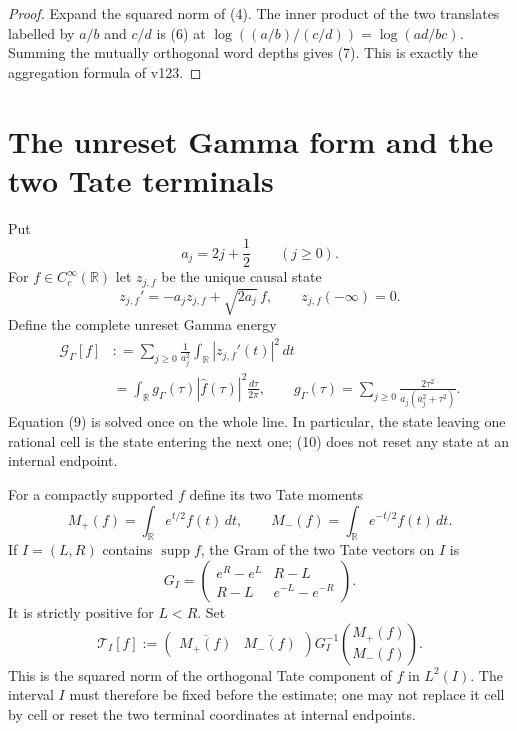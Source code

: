 \documentclass[11pt]{article}
\begin{document}
\begin{proof}
Expand the squared norm of (4).  The inner product of the two translates
labelled by $a/b$ and $c/d$ is (6) at
$\log((a/b)/(c/d))=\log(ad/bc)$.  Summing the mutually orthogonal word
depths gives (7).  This is exactly the aggregation formula of v123.
\end{proof}

\section{The unreset Gamma form and the two Tate terminals}

Put
\begin{equation}
 a_j=2j+\frac12\qquad(j\ge0).                               \tag{8}
\end{equation}
For $f\in C_c^\infty(\mathbb R)$ let $z_{j,f}$ be the unique causal state
\begin{equation}
 z_{j,f}'=-a_jz_{j,f}+\sqrt{2a_j}\,f,
 \qquad z_{j,f}(-\infty)=0.                                \tag{9}
\end{equation}
Define the complete unreset Gamma energy
\begin{align}
 \mathcal G_\Gamma[f]
 &: =\sum_{j\ge0}\frac1{a_j^2}
       \int_{\mathbb R}|z_{j,f}'(t)|^2\,dt                 \tag{10}\\
 &=\int_{\mathbb R}g_\Gamma(\tau)|\widehat f(\tau)|^2
       \frac{d\tau}{2\pi},\qquad
 g_\Gamma(\tau)=
 \sum_{j\ge0}\frac{2\tau^2}{a_j(a_j^2+\tau^2)}.          \tag{11}
\end{align}
Equation (9) is solved once on the whole line.  In particular, the state
leaving one rational cell is the state entering the next one; (10) does
not reset any state at an internal endpoint.

For a compactly supported $f$ define its two Tate moments
\begin{equation}
 M_+(f)=\int_{\mathbb R}e^{t/2}f(t)\,dt,
 \qquad
 M_-(f)=\int_{\mathbb R}e^{-t/2}f(t)\,dt.                  \tag{12}
\end{equation}
If $I=(L,R)$ contains $\operatorname{supp}f$, the Gram of the two Tate
vectors on $I$ is
\begin{equation}
 G_I=
 \begin{pmatrix}
 e^R-e^L&R-L\\
 R-L&e^{-L}-e^{-R}
 \end{pmatrix}.                                             \tag{13}
\end{equation}
It is strictly positive for $L<R$.  Set
\begin{equation}
 \mathcal T_I[f]
 :=
 \begin{pmatrix}\overline{M_+(f)}&\overline{M_-(f)}\end{pmatrix}
 G_I^{-1}
 \binom{M_+(f)}{M_-(f)}.                                   \tag{14}
\end{equation}
This is the squared norm of the orthogonal Tate component of $f$ in
$L^2(I)$.  The interval $I$ must therefore be fixed before the estimate;
one may not replace it cell by cell or reset the two terminal coordinates
at internal endpoints.
\end{document}
